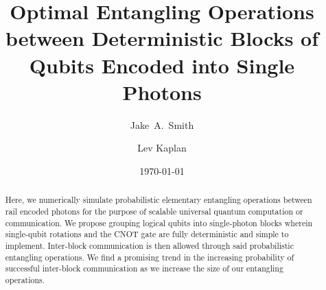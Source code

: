 \documentclass[aps,pra,twocolumn,showpacs,superscriptaddress,floatfix,10pt]{revtex4}
\begin{document}
\newcommand{\beq}{\begin{equation}}
\newcommand{\eeq}{\end{equation}}
\newcommand{\ben}{\begin{eqnarray}}
\newcommand{\een}{\end{eqnarray}}
\newcommand{\bea}{\begin{array}}
\newcommand{\eea}{\end{array}}
\newcommand{\om}{(\omega )}
\newcommand{\bef}{\begin{figure}}
\newcommand{\eef}{\end{figure}}
\newcommand{\leg}[1]{\caption{\protect\rm{\protect\footnotesize{#1}}}}
\newcommand{\ew}[1]{\langle{#1}\rangle}
\newcommand{\be}[1]{\mid\!{#1}\!\mid}
\newcommand{\no}{\nonumber}
\newcommand{\etal}{{\em et~al }}
\newcommand{\geff}{g_{\mbox{\it{\scriptsize{eff}}}}}
\newcommand{\da}[1]{{#1}^\dagger}
\newcommand{\cf}{{\it cf.\/}\ }
\newcommand{\ie}{{\it i.e.\/}\ }   

\newcommand{\spazio}{\vspace{0.3cm}}%
\newcommand{\de}[1]{\frac{\partial}{\partial{#1}}}
\newcommand{\U}{\tilde{U}}
\newcommand{\V}{\tilde{V}}


\title{Optimal Entangling Operations between Deterministic Blocks of Qubits Encoded into Single Photons}

\author{Jake~A.~Smith}

\author{Lev Kaplan}

 \begin{abstract}
Here, we numerically simulate probabilistic elementary entangling operations between rail encoded photons for the purpose of scalable universal quantum computation or communication. We propose grouping logical qubits into single-photon blocks wherein single-qubit rotations and the CNOT gate are fully deterministic and simple to implement. Inter-block communication is then allowed through said probabilistic entangling operations. We find a promising trend in the increasing probability of successful inter-block communication as we increase the size of our entangling operations.
\end{abstract}                                                               
\date{\today}
\maketitle
\end{document}
